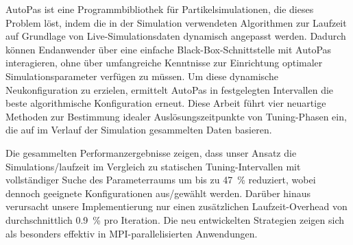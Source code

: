 AutoPas ist eine Programmbibliothek für Partikelsimulationen, die dieses Problem löst, indem die in der Simulation verwendeten Algorithmen zur Laufzeit auf Grundlage von Live-Simulationsdaten dynamisch angepasst werden. Dadurch können Endanwender über eine einfache Black-Box-Schnittstelle mit AutoPas interagieren, ohne über umfangreiche Kenntnisse zur Einrichtung optimaler Simulationsparameter verfügen zu müssen. Um diese dynamische Neukonfiguration zu erzielen, ermittelt AutoPas in festgelegten Intervallen die beste algorithmische Konfiguration erneut. Diese Arbeit führt vier neuartige Methoden zur Bestimmung idealer Auslösungszeitpunkte von Tuning-Phasen ein, die auf im Verlauf der Simulation gesammelten Daten basieren.

Die gesammelten Performanzergebnisse zeigen, dass unser Ansatz die Simulations\-/laufzeit im Vergleich zu statischen Tuning-Intervallen mit vollständiger Suche des Parameterraums um bis zu \qty{47}{\percent} reduziert, wobei dennoch geeignete Konfigurationen aus\-/gewählt werden. Darüber hinaus verursacht unsere Implementierung nur einen zusätzlichen Laufzeit-Overhead von  durchschnittlich \qty{0.9}{\percent} pro Iteration. Die neu entwickelten Strategien zeigen sich als besonders effektiv in MPI-parallelisierten Anwendungen.


\MediaOptionLogicBlank
